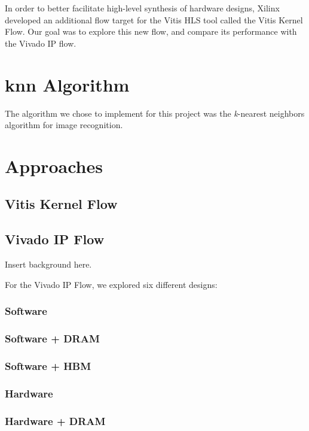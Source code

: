 \documentclass[conference,a4paper]{IEEEtran}[2015/08/26]
\begin{document}
In order to better facilitate high-level synthesis of hardware designs, Xilinx developed an additional flow target for the Vitis HLS tool called the Vitis Kernel Flow. 
Our goal was to explore this new flow, and compare its performance with the Vivado IP flow.  

\section{knn Algorithm}
\label{sec:knn-algorithm}

The algorithm we chose to implement for this project was the \textit{k}-nearest neighbors algorithm for image recognition.

\section{Approaches}
\label{sec:approaches}

\subsection{Vitis Kernel Flow}

\subsection{Vivado IP Flow}

Insert background here.

For the Vivado IP Flow, we explored six different designs:

\subsubsection{Software}

\subsubsection{Software + DRAM}

\subsubsection{Software + HBM}

\subsubsection{Hardware}

\subsubsection{Hardware + DRAM}
\end{document}
